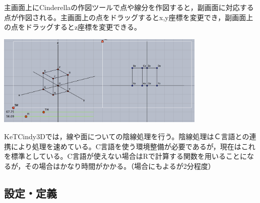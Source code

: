 \documentclass[papersize,a4paper,12pt,uplatex]{jsarticle}
\begin{document}
主画面上にCinderellaの作図ツールで点や線分を作図すると，副画面に対応する点が作図される。主画面上の点をドラッグするとx,y座標を変更でき，副画面上の点をドラッグするとz座標を変更できる。

\vspace{\baselineskip}
\begin{center}
 \includegraphics[bb=0.00 0.00 863.04 378.52 , width=10cm]{Fig/3dscreen.pdf}
\end{center}

KeTCindy3Dでは，線や面についての陰線処理を行う。陰線処理はＣ言語との連携により処理を速めている。C言語を使う環境整備が必要であるが，現在はこれを標準としている。C言語が使えない場合はRで計算する関数を用いることになるが，その場合はかなり時間がかかる。（場合にもよるが2分程度）

\newpage
\subsection{設定・定義}
\end{document}

